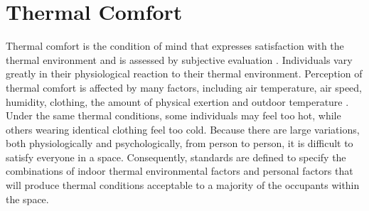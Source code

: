 



\section{Thermal Comfort} \label{cha:bg:atc} 

Thermal comfort is the condition of mind that expresses satisfaction with the thermal environment and is assessed by subjective evaluation \citep{ashrae2013thermal}. Individuals vary greatly in their physiological reaction to their thermal environment. Perception of thermal comfort is affected by many factors, including air temperature, air speed, humidity, clothing, the amount of physical exertion and outdoor temperature \citep{bradshaw2010human}. Under the same thermal conditions, some individuals may feel too hot, while others wearing identical clothing feel too cold. Because there are large variations, both physiologically and psychologically, from person to person, it is difficult to satisfy everyone in a space. Consequently, standards are defined to specify the combinations of indoor thermal environmental factors and personal factors that will produce thermal conditions acceptable to a majority of the occupants within the space. 

